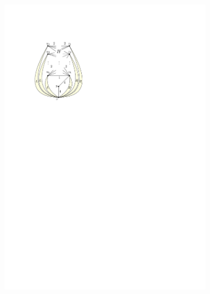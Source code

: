 \documentclass[runningheads]{llncs}
\begin{document}
\begin{figure}[htpb]
     \centering
     \begin{subfigure}[b]{0.40\textwidth}
         \centering
         \includegraphics[scale=1]{img/act-hamilton-cycle-a}
         \label{fig:act-hamilton-cycle-a}
     \end{subfigure}
     \hfill
     \begin{subfigure}[b]{0.32\textwidth}
         \centering

\end{subfigure}
\end{figure}
\end{document}
